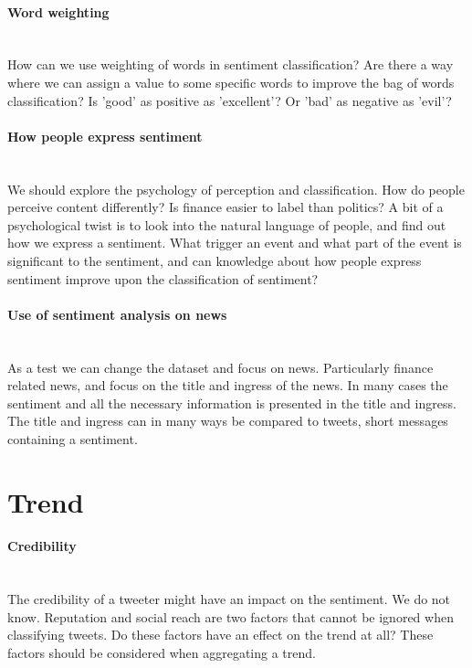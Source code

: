 \paragraph{Word weighting}
\hspace{0pt}\\
How can we use weighting of words in sentiment classification? Are there a way
where we can assign a value to some specific words to improve the bag of words
classification? Is 'good' as positive as 'excellent'? Or 'bad' as negative as
'evil'? 

\paragraph{How people express sentiment}
\hspace{0pt}\\
We should explore the psychology of perception and classification. How do
people perceive content differently? Is finance easier to label than politics?
A bit of a psychological twist is to look into the natural language of people,
and find out how we express a sentiment. What trigger an event and what part
of the event is significant to the sentiment, and can knowledge about how
people express sentiment improve upon the classification of sentiment? 

\paragraph{Use of sentiment analysis on news}
\hspace{0pt}\\
As a test we can change the dataset and focus on news. Particularly finance
related news, and focus on the title and ingress of the news. In many cases the
sentiment and all the necessary information is presented in the title and
ingress. The title and ingress can in many ways be compared to tweets, short
messages containing a sentiment.   
%

\section{Trend}\label{future_work:trend}
\paragraph{Credibility}
\hspace{0pt}\\
The credibility of a tweeter might have an impact on the sentiment. We do not
know. Reputation and social reach are two factors that cannot be ignored when 
classifying tweets. Do these factors have an effect on the trend at all? These
factors should be considered when aggregating a trend. 


